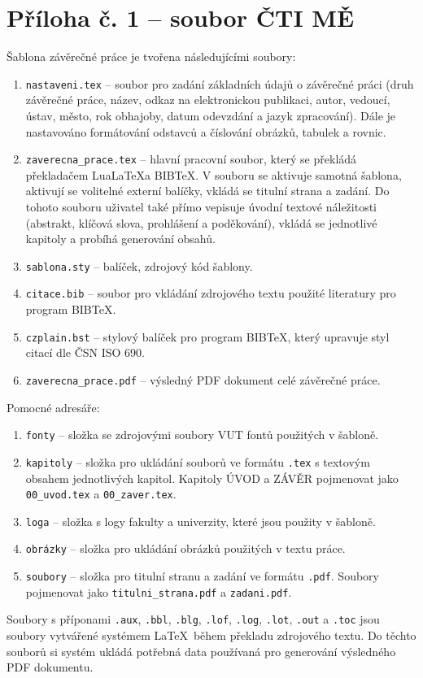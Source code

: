 \chapter{Příloha č. 1 -- soubor ČTI MĚ}
Šablona závěrečné práce je tvořena následujícími soubory:

\begin{enumerate}
	\item \verb|nastaveni.tex| -- soubor pro zadání základních údajů o závěrečné práci (druh závěrečné práce, název, odkaz na elektronickou publikaci, autor, vedoucí, ústav, město, rok obhajoby, datum odevzdání a jazyk zpracování). Dále je nastavováno formátování odstavců a číslování obrázků, tabulek a rovnic.
	\item \verb|zaverecna_prace.tex| -- hlavní pracovní soubor, který se překládá překladačem Lua\LaTeX a BIB\TeX. V souboru se aktivuje samotná šablona, aktivují se volitelné externí balíčky, vkládá se titulní strana a zadání. Do tohoto souboru uživatel také přímo vepisuje úvodní textové náležitosti (abstrakt, klíčová slova, prohlášení a poděkování), vkládá se jednotlivé kapitoly a probíhá generování obsahů.
	\item \verb|sablona.sty| -- balíček, zdrojový kód šablony.
	\item \verb|citace.bib| -- soubor pro vkládání zdrojového textu použité literatury pro program BIB\TeX.
	\item \verb|czplain.bst| -- stylový balíček pro program BIB\TeX, který upravuje styl citací dle ČSN ISO 690.
	\item \verb|zaverecna_prace.pdf| -- výsledný PDF dokument celé závěrečné práce.	
\end{enumerate}

Pomocné adresáře:

\begin{enumerate}
	\item \verb|fonty| -- složka se zdrojovými soubory VUT fontů použitých v šabloně.
	\item \verb|kapitoly| -- složka pro ukládání souborů ve formátu \verb|.tex| s textovým obsahem jednotlivých kapitol. Kapitoly ÚVOD a ZÁVĚR pojmenovat jako \verb|00_uvod.tex| a \verb|00_zaver.tex|.
	\item \verb|loga| -- složka s logy fakulty a univerzity, které jsou použity v šabloně.
	\item \verb|obrázky| -- složka pro ukládání obrázků použitých v textu práce.
	\item \verb|soubory| -- složka pro titulní stranu a zadání ve formátu \verb|.pdf|. Soubory pojmenovat jako \verb|titulni_strana.pdf| a \verb|zadani.pdf|.
\end{enumerate}

Soubory s příponami \verb|.aux|, \verb|.bbl|, \verb|.blg|, \verb|.lof|, \verb|.log|, \verb|.lot|, \verb|.out| a \verb|.toc| jsou soubory vytvářené systémem \LaTeX\ během překladu zdrojového textu. Do těchto souborů si systém ukládá potřebná data používaná pro generování výsledného PDF dokumentu.